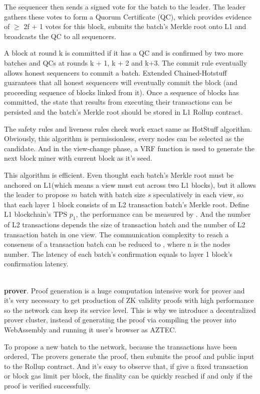 \documentclass{article}
\begin{document}
The sequencer then sends a signed vote for the batch to the leader. The leader gathers these votes to form a Quorum Certificate (QC), which provides evidence of $\ge$ 2f + 1 votes for this block, submits the batch's Merkle root onto L1 and broadcasts the QC to all sequencers.

A block at round k is committed if it has a QC and is confirmed by two more batches and QCs at rounds k + 1, k + 2 and k+3. The commit rule eventually allows honest sequencers to commit a batch. Extended Chained-Hotstuff guarantees that all honest sequencers will eventually commit the block (and proceeding sequence of blocks linked from it). Once a sequence of blocks has committed, the state that results from executing their transactions can be persisted and the batch's Merkle root should be stored in L1 Rollup contract.

The safety rules and liveness rules check work exact same as HotStuff algorithm. Obviously, this algorithm is permissionless, every nodes can be selected as the candidate. And in the view-change phase, a VRF function is used to generate the next block miner with current block as it's seed.

This algorithm is efficient. Even thought each batch's Merkle root must be anchored on L1(which means a view must cut across two L1 blocks), but it allows the leader to propose $m$ batch with batch size $s$ speculatively in each view, so that each layer 1 block consists of m L2 transaction batch's Merkle root. Define L1 blockchain's TPS $p_1$, the performance can be measured by . And the number of L2 transactions depends the size of transaction batch and the number of L2 transaction batch in one view. The communication complexity to reach a consensus of a transaction batch can be reduced to , where n is the nodes number. The latency of each batch's confirmation equals to layer 1 block's confirmation latency.

~\\
\noindent\textbf{prover}. Proof generation is a huge computation intensive work for prover and it's very necessary to get production of ZK validity proofs with high performance so the network can keep its service level. This is why we introduce a decentralized prover cluster, instead of generating the proof via compiling the prover into WebAssembly and running it user's browser as AZTEC.

To propose a new batch to the network, because the transactions have been ordered, The provers generate the proof, then submits the proof and public input to the Rollup contract. And it's easy to observe that, if give a fixed transaction or block gas limit per block, the finality can be quickly reached if and only if the proof is verified successfully.
\end{document}
